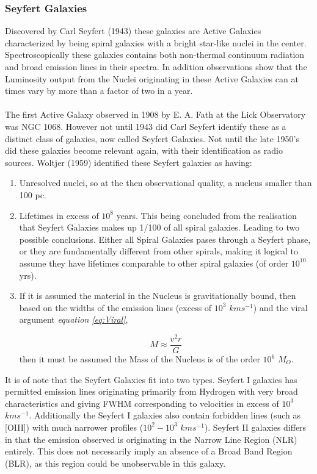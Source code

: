 \documentclass[11pt]{article}
\begin{document}
\subsubsection{Seyfert Galaxies}
Discovered by Carl Seyfert (1943) these galaxies are Active Galaxies characterized by being spiral galaxies with a bright star-like nuclei in the center. Spectroscopically these galaxies contains both non-thermal continuum radiation and broad emission lines in their spectra. In addition observations show that the Luminosity output from the Nuclei originating in these Active Galaxies can at times vary by more than a factor of two in a year. \\
\\
The first Active Galaxy observed in 1908 by E. A. Fath at the Lick Observatory was NGC 1068. However not until 1943 did Carl Seyfert identify these as a distinct class of galaxies, now called Seyfert Galaxies. Not until the late 1950's did these galaxies become relevant again, with their identification as radio sources. Woltjer (1959) identified these Seyfert galaxies as having:
\begin{enumerate}
\item Unresolved nuclei, so at the then observational quality, a nucleus smaller than 100 pc. 
\item Lifetimes in excess of $10^8$ years. This being concluded from the realisation that Seyfert Galaxies makes up 1/100 of all spiral galaxies. Leading to two possible conclusions. Either all Spiral Galaxies pases through a Seyfert phase, or they are fundamentally different from other spirals, making it logical to assume they have lifetimes comparable to other spiral galaxies (of order $10^{10}$ yrs).
\item If it is assumed the material in the Nucleus is gravitationally bound, then based on the widths of the emission lines (excess of $10^3$ $kms^{-1}$) and the viral argument \emph{equation \ref{eq:Viral}},

\begin{equation}
M \approx \frac{v^2r} {G}
\label{eq:Viral}
\end{equation}
then it must be assumed the Mass of the Nucleus is of the order $10^6$ $M_O$.
\end{enumerate}
It is of note that the Seyfert Galaxies fit into two types. Seyfert I galaxies has permitted emission lines originating primarily from Hydrogen with very broad characteristics and giving FWHM corresponding to velocities in excess of $10^3$ $kms^{-1}$. Additionally the Seyfert I galaxies also contain forbidden lines (such as [OIII]) with much narrower profiles ($10^2-10^3$ $kms^{-1}$). Seyfert II galaxies differs in that the emission observed is originating in the Narrow Line Region (NLR) entirely. This does not necessarily imply an absence of a Broad Band Region (BLR), as this region could be unobservable in this galaxy.
\end{document}
